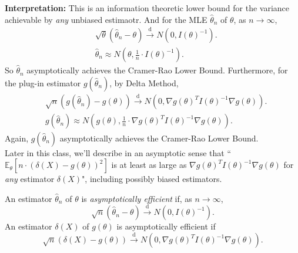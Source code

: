 \documentclass[a4paper]{article}
\begin{document}
\noindent \textbf{Interpretation:} This is an information theoretic lower bound for the variance achievable by \emph{any} unbiased estimaotr. And for the MLE $\hat{\theta}_n$ of $\theta$, as $n \to \infty$,
\begin{equation*}
	\begin{aligned}
		& \sqrt{\theta} (\hat{\theta}_n - \theta) \stackrel{\text{d}}{\longrightarrow} N \left(0,I(\theta)^{-1}\right). \\
		& \hat{\theta}_n \approx N\left(\theta,\frac{1}{n} \cdot I(\theta)^{-1}\right).
	\end{aligned}
\end{equation*} 
So $\hat{\theta}_n$ asymptotically achieves the Cramer-Rao Lower Bound. Furthermore, for the plug-in estimator $g(\hat{\theta}_n)$, by Delta Method,
\begin{equation*}
	\begin{aligned}
		& \sqrt{n}(g(\hat{\theta}_n) - g(\theta)) \stackrel{\text{d}}{\longrightarrow} N\left(0,\nabla g(\theta)^T I(\theta)^{-1} \nabla g(\theta)\right). \\
		& g(\hat{\theta}_n) \approx N\left(g(\theta),\frac{1}{n} \cdot \nabla g(\theta)^T I(\theta)^{-1} \nabla g(\theta)\right).
	\end{aligned}
\end{equation*} 
Again, $g(\hat{\theta}_n)$ asymptotically achieves the Cramer-Rao Lower Bound.\\

\noindent Later in this class, we'll describe in an asymptotic sense that ``$\mathbb{E}_{\theta}[n \cdot (\delta(X)-g(\theta))^2]$ is at least as large as $\nabla g(\theta)^T I(\theta)^{-1} \nabla g(\theta)$ for \emph{any} estimator $\delta(X)$", including possibly biased estimators.

\begin{defi}
	An estimator $\hat{\theta}_n$ of $\theta$ is \emph{asymptotically efficient} if, as $n \to \infty$,
	\begin{equation}
		\sqrt{n}(\hat{\theta}_n - \theta) \stackrel{\text{d}}{\longrightarrow} N(0,I(\theta)^{-1}).
	\end{equation}
	An estimator $\delta(X)$ of $g(\theta)$ is asymptotically efficient if
	\begin{equation}
		\sqrt{n}(\delta(X)-g(\theta)) \stackrel{\text{d}}{\longrightarrow} N\left(0,\nabla g(\theta)^T I(\theta)^{-1} \nabla g(\theta)\right).
	\end{equation}
\end{defi}
\end{document}
